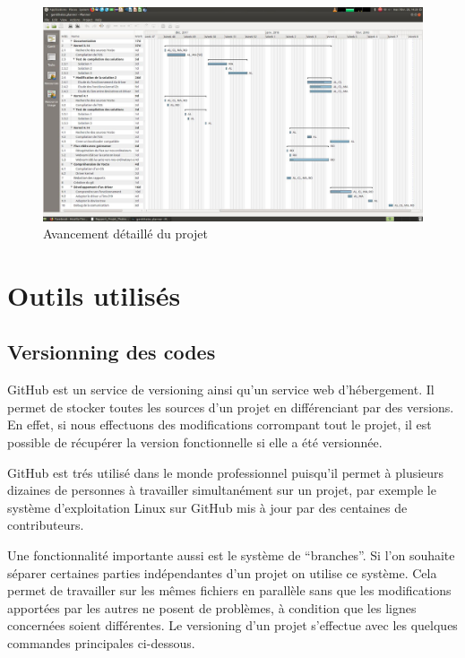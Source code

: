 \begin{landscape}
    \begin{figure}[!htb]
        \centering
        \includegraphics[trim={2.5cm 2cm 0cm 3.5cm},clip,scale=0.4]{Figures/gantt.png}
        \decoRule
        \caption{Avancement détaillé du projet} \label{fig:planning}
    \end{figure}
\end{landscape}

\section{Outils utilisés}

\subsection{Versionning des codes}

GitHub est un service de versioning ainsi qu’un service web d’hébergement. Il permet de
stocker toutes les sources d’un projet en différenciant par des versions. En effet, si nous
effectuons des modifications corrompant tout le projet, il est possible de récupérer la
version fonctionnelle si elle a été versionnée. \medskip

GitHub est trés utilisé dans le monde professionnel puisqu’il permet à plusieurs dizaines
de personnes à travailler simultanément sur un projet, par exemple le système
d’exploitation Linux sur GitHub mis à jour par des centaines de contributeurs. \medskip

Une fonctionnalité importante aussi est le système de “branches”. Si l’on souhaite séparer
certaines parties indépendantes d’un projet on utilise ce système. Cela permet de travailler
sur les mêmes fichiers en parallèle sans que les modifications apportées par les autres ne
posent de problèmes, à condition que les lignes concernées soient différentes. Le
versioning d’un projet s’effectue avec les quelques commandes principales ci-dessous.

